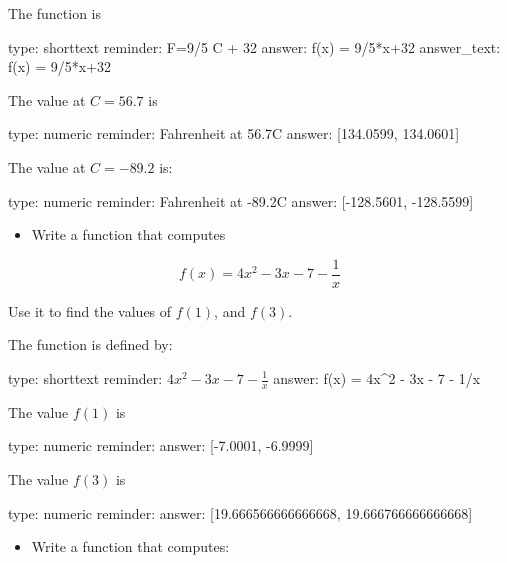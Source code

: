 \documentclass[12pt]{article}
\begin{document}
The function is

\begin{answer}
type: shorttext
reminder: F=9/5 C + 32
answer: f(x) = 9/5*x+32
answer_text: f(x) =  9/5*x+32 
\end{answer}

The value at $C=56.7$ is

\begin{answer}
    type: numeric
    reminder: Fahrenheit at 56.7C
    answer: [134.0599, 134.0601]

\end{answer}

The value at $C=-89.2$ is:

\begin{answer}
    type: numeric
    reminder: Fahrenheit at -89.2C
    answer: [-128.5601, -128.5599]

\end{answer}

\begin{itemize}
\itemsep1pt\parskip0pt
\item
  Write a function that computes
\end{itemize}

\[
f(x) = 4x^2 - 3x  - 7 - \frac{1}{x}
\]

Use it to find the values of $f(1)$, and $f(3)$.

The function is defined by:

\begin{answer}
type: shorttext
reminder: \( 4x^2 - 3x  - 7 - \frac{1}{x} \)
answer: f(x) = 4x^2 - 3x  - 7 - 1/x

\end{answer}

The value $f(1)$ is

\begin{answer}
    type: numeric
    reminder: 
    answer: [-7.0001, -6.9999]

\end{answer}

The value $f(3)$ is

\begin{answer}
    type: numeric
    reminder: 
    answer: [19.666566666666668, 19.666766666666668]

\end{answer}

\begin{itemize}
\itemsep1pt\parskip0pt
\item
  Write a function that computes:
\end{itemize}
\end{document}
